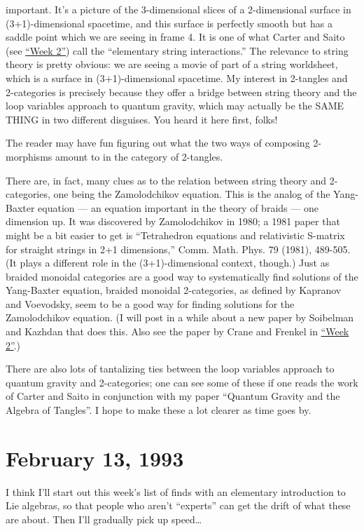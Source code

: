 \documentclass{article}
\begin{document}
important. It's a picture of the 3-dimensional slices of a 2-dimensional
surface in (3+1)-dimensional spacetime, and this surface is perfectly
smooth but has a saddle point which we are seeing in frame 4. It is one
of what Carter and Saito (see \protect\hyperlink{week2}{``Week 2''})
call the ``elementary string interactions.'' The relevance to string
theory is pretty obvious: we are seeing a movie of part of a string
worldsheet, which is a surface in (3+1)-dimensional spacetime. My
interest in 2-tangles and 2-categories is precisely because they offer a
bridge between string theory and the loop variables approach to quantum
gravity, which may actually be the SAME THING in two different
disguises. You heard it here first, folks!

The reader may have fun figuring out what the two ways of composing
2-morphisms amount to in the category of 2-tangles.

There are, in fact, many clues as to the relation between string theory
and 2-categories, one being the Zamolodchikov equation. This is the
analog of the Yang-Baxter equation --- an equation important in the
theory of braids --- one dimension up. It was discovered by
Zamolodchikov in 1980; a 1981 paper that might be a bit easier to get is
``Tetrahedron equations and relativistic S-matrix for straight strings
in 2+1 dimensions,'' Comm. Math. Phys. 79 (1981), 489-505. (It plays a
different role in the (3+1)-dimensional context, though.) Just as
braided monoidal categories are a good way to systematically find
solutions of the Yang-Baxter equation, braided monoidal 2-categories, as
defined by Kapranov and Voevodsky, seem to be a good way for finding
solutions for the Zamolodchikov equation. (I will post in a while about
a new paper by Soibelman and Kazhdan that does this. Also see the paper
by Crane and Frenkel in \protect\hyperlink{week2}{``Week 2''}.)

There are also lots of tantalizing ties between the loop variables
approach to quantum gravity and 2-categories; one can see some of these
if one reads the work of Carter and Saito in conjunction with my paper
``Quantum Gravity and the Algebra of Tangles''. I hope to make these a
lot clearer as time goes by.
\hypertarget{week5}{%
\section{February 13, 1993}\label{week5}}

I think I'll start out this week's list of finds with an elementary
introduction to Lie algebras, so that people who aren't ``experts'' can
get the drift of what these are about. Then I'll gradually pick up
speed\ldots{}
\end{document}
